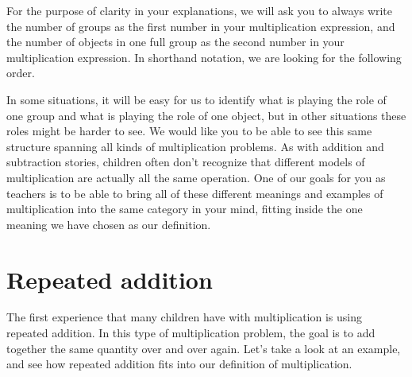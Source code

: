 \documentclass{ximera}
\begin{document}
For the purpose of clarity in your explanations, we will ask you to always write the number of groups as the first number in your multiplication expression, and the number of objects in one full group as the second number in your multiplication expression. In shorthand notation, we are looking for the following order.
\begin{image}
\end{image}

In some situations, it will be easy for us to identify what is playing the role of one group and what is playing the role of one object, but in other situations these roles might be harder to see. We would like you to be able to see this same structure spanning all kinds of multiplication problems. As with addition and subtraction stories, children often don't recognize that different models of multiplication are actually all the same operation. One of our goals for you as teachers is to be able to bring all of these different meanings and examples of multiplication into the same category in your mind, fitting inside the one meaning we have chosen as our definition.



\section{Repeated addition}

The first experience that many children have with multiplication is using repeated addition. In this type of multiplication problem, the goal is to add together the same quantity over and over again. Let's take a look at an example, and see how repeated addition fits into our definition of multiplication.
\end{document}
